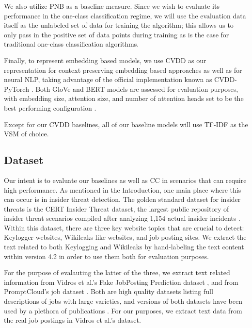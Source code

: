 \documentclass[11pt]{article}
\begin{document}
We also utilize PNB as a baseline measure. Since we wish to evaluate its performance in the one-class classification regime, we will use the evaluation data itself as the unlabeled set of data for training the algorithm; this allows us to only pass in the positive set of data points during training as is the case for traditional one-class classification algorithms.

Finally, to represent embedding based models, we use CVDD as our representation for context preserving embedding based approaches as well as for neural NLP, taking advantage of the official implementation known as CVDD-PyTorch \cite{ruff2019self}. Both GloVe and BERT models are assessed for evaluation purposes, with embedding size, attention size, and number of attention heads set to be the best performing configuration .

Except for our CVDD baselines, all of our baseline models will use TF-IDF as the VSM of choice.

\subsection{Dataset}
Our intent is to evaluate our baselines as well as CC in scenarios that can require high performance. As mentioned in the Introduction, one main place where this can occur is in insider threat detection. The golden standard dataset for insider threats is the CERT Insider Threat dataset, the largest public repository of insider threat scenarios compiled after analyzing 1,154 actual insider incidents \cite{glasser2013bridging}. Within this dataset, there are three key website topics that are crucial to detect: Keylogger websites, Wikileaks-like websites, and job posting sites. We extract the text related to both Keylogging and Wikileaks by hand-labeling the text content within version 4.2 in order to use them both for evaluation purposes.

For the purpose of evalauting the latter of the three, we extract text related information from Vidros et al.'s Fake JobPosting Prediction dataset \cite{vidros2017automatic}, and from PromptCloud's job dataset \cite{monsterjobs17}. Both are high quality datasets listing full descriptions of jobs with large varieties, and versions of both datasets have been used by a plethora of publications \cite{balachander2018ontology, kim2019fraud, alghamdi2019intelligent, mahbub2018using, reddy2018analysis}. For our purposes, we extract text data from the real job postings in Vidros et al.'s dataset.
\end{document}
